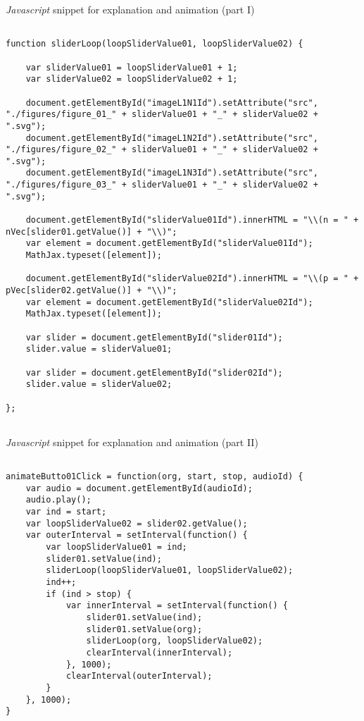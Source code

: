 \documentclass[12pt]{article}
\begin{document}
\begin{CodeSnippet}[!hp]
	\centering
	\caption{\emph{Javascript} snippet for explanation and animation (part I)}
\vspace{0.25cm}	
	\begin{BVerbatim}
		
function sliderLoop(loopSliderValue01, loopSliderValue02) {
	
	var sliderValue01 = loopSliderValue01 + 1;
	var sliderValue02 = loopSliderValue02 + 1;
	
	document.getElementById("imageL1N1Id").setAttribute("src", "./figures/figure_01_" + sliderValue01 + "_" + sliderValue02 + ".svg");
	document.getElementById("imageL1N2Id").setAttribute("src", "./figures/figure_02_" + sliderValue01 + "_" + sliderValue02 + ".svg");
	document.getElementById("imageL1N3Id").setAttribute("src", "./figures/figure_03_" + sliderValue01 + "_" + sliderValue02 + ".svg");
	
	document.getElementById("sliderValue01Id").innerHTML = "\\(n = " + nVec[slider01.getValue()] + "\\)";
	var element = document.getElementById("sliderValue01Id");
	MathJax.typeset([element]);
	
	document.getElementById("sliderValue02Id").innerHTML = "\\(p = " + pVec[slider02.getValue()] + "\\)";
	var element = document.getElementById("sliderValue02Id");
	MathJax.typeset([element]);
	
	var slider = document.getElementById("slider01Id");
	slider.value = sliderValue01;
	
	var slider = document.getElementById("slider02Id");
	slider.value = sliderValue02;
	
};
		
	\end{BVerbatim}
	\vspace*{-2mm}
	\label{JsCodSniAn01}
\end{CodeSnippet}

\begin{CodeSnippet}[!hp]
	\centering
	\caption{\emph{Javascript} snippet for explanation and animation (part II)}
\vspace{0.25cm}	
	\begin{BVerbatim}
		
animateButto01Click = function(org, start, stop, audioId) {
	var audio = document.getElementById(audioId);
	audio.play();
	var ind = start;
	var loopSliderValue02 = slider02.getValue();
	var outerInterval = setInterval(function() {
		var loopSliderValue01 = ind;
		slider01.setValue(ind);
		sliderLoop(loopSliderValue01, loopSliderValue02);
		ind++;
		if (ind > stop) {
			var innerInterval = setInterval(function() {
				slider01.setValue(ind);
				slider01.setValue(org);
				sliderLoop(org, loopSliderValue02);
				clearInterval(innerInterval);
			}, 1000);
			clearInterval(outerInterval);
		}
	}, 1000);
}
		
	\end{BVerbatim}
	\vspace*{-2mm}
	\label{JsCodSniAn02}
\end{CodeSnippet}
\end{document}
